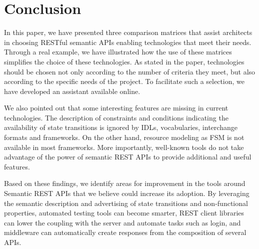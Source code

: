 \section{Conclusion}

\vspace*{-0.2cm}

In this paper, we have presented three comparison matrices that assist architects in choosing RESTful semantic APIs enabling technologies that meet their needs.
Through a real example, we have illustrated how the use of these matrices simplifies the choice of these technologies. 
As stated in the paper, technologies should be chosen not only according to the number of criteria they meet, but also according to the specific needs of the project. 
To facilitate such a selection, we have developed an assistant available online.

We also pointed out that some interesting features are missing in current technologies.
The description of constraints and conditions indicating the availability of state transitions is ignored by IDLs, vocabularies, interchange formats and frameworks. On the other hand, resource modeling as FSM is not available in most frameworks.
More importantly, well-known tools do not take advantage of the power of semantic REST APIs to provide additional and useful features.

Based on these findings, we identify areas for improvement in the tools around Semantic REST APIs that we believe could increase its adoption. By leveraging the semantic description and advertising of state transitions and non-functional properties, automated testing tools can become smarter, REST client libraries can lower the coupling with the server and automate tasks such as login, and middleware can automatically create responses from the composition of several APIs.